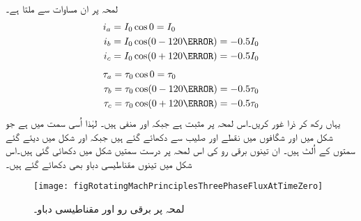 لمحہ  پر ان مساوات سے ملتا ہے۔
\begin{gather}
\begin{aligned}
i_a&=I_0 \cos 0=I_0\\
i_b&=I_0 \cos (0-120\degree)=-0.5 I_0\\
i_c&=I_0 \cos (0+120\degree)=-0.5 I_0
\end{aligned}
\end{gather}
%
\begin{gather}
\begin{aligned}
\tau_a&=\tau_0 \cos 0=\tau_0\\
\tau_b&=\tau_0 \cos (0-120\degree)=-0.5 \tau_0\\
\tau_c&=\tau_0 \cos (0+120\degree)=-0.5 \tau_0
\end{aligned}
\end{gather}
یہاں رکھ کر ذرا غور کریں۔اس لمحہ پر   مثبت ہے جبکہ  اور  منفی ہیں۔ لہٰذا   اُسی سمت میں ہے جو شکل   میں  اور  شگافوں میں نقطے اور صلیب سے  دکھائے  گئے ہیں جبکہ   اور  شکل میں دیئے گئے سمتوں کے اُلٹ ہیں۔ ان تینوں برقی رو کی اس لمحہ پر درست سمتیں شکل   میں دکھائی گئی ہیں۔اس شکل میں تینوں مقناطیسی دباو بھی دکھائے گئے ہیں۔
\begin{figure}
\centering
\texttt{[image: figRotatingMachPrinciplesThreePhaseFluxAtTimeZero]}
\caption{ لمحہ  پر برقی رو اور مقناطیسی دباو۔}
\label{شکل_گھومتے_مشین_لمحہ_صفر_پر_کل_دباو}
\end{figure}

